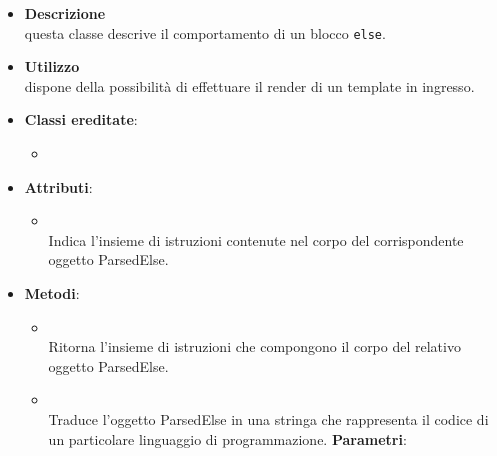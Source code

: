 \label{\nogloxy{swedesigner::server::project::ParsedElse}}
\begin{figure}[h]
\centering
{}
\caption{}
\end{figure}
\FloatBarrier
\begin{itemize}
\item \textbf{Descrizione}\\
questa classe descrive il comportamento di un blocco \texttt{else}.
\item \textbf{Utilizzo}\\
dispone della possibilità di effettuare il render di un template in ingresso.
\item \textbf{Classi ereditate}:
\begin{itemize}
\item \hyperref[\nogloxy{swedesigner::server::project::ParsedInstruction}]{}
\end{itemize}
\item \textbf{Attributi}:
\begin{itemize}
\item {}
\\ Indica l'insieme di istruzioni contenute nel corpo del corrispondente oggetto ParsedElse.
\end{itemize}
\item \textbf{Metodi}:
\begin{itemize}
\item {}
\\ Ritorna l'insieme di istruzioni che compongono il corpo del relativo oggetto ParsedElse.
\item {}
\\ Traduce l'oggetto ParsedElse in una stringa che rappresenta il codice di un particolare linguaggio di programmazione.
\textbf{Parametri}:

\end{itemize}
\end{itemize}
